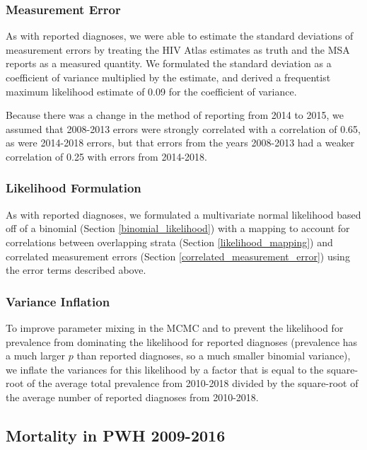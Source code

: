 \documentclass{article}
\begin{document}
\subsubsection{Measurement Error} \label{prevalence_measurement_error}

As with reported diagnoses, we were able to estimate the standard deviations of measurement errors by treating the HIV Atlas estimates as truth and the MSA reports as a measured quantity. We formulated the standard deviation as a coefficient of variance multiplied by the estimate, and derived a frequentist maximum likelihood estimate of 0.09 for the coefficient of variance.

Because there was a change in the method of reporting from 2014 to 2015, we assumed that 2008-2013 errors were strongly correlated with a correlation of 0.65, as were 2014-2018 errors, but that errors from the years 2008-2013 had a weaker correlation of 0.25 with errors from 2014-2018.

\subsubsection{Likelihood Formulation}

As with reported diagnoses, we formulated a multivariate normal likelihood based off of a binomial (Section \ref{binomial_likelihood}) with a mapping to account for correlations between overlapping strata (Section \ref{likelihood_mapping}) and correlated measurement errors (Section \ref{correlated_measurement_error}) using the error terms described above.

\subsubsection{Variance Inflation}
To improve parameter mixing in the MCMC and to prevent the likelihood for prevalence from dominating the likelihood for reported diagnoses (prevalence has a much larger $p$ than reported diagnoses, so a much smaller binomial variance), we inflate the variances for this likelihood by a factor that is equal to the square-root of the average total prevalence from 2010-2018 divided by the square-root of the average number of reported diagnoses from 2010-2018.

\subsection{Mortality in PWH 2009-2016}
\end{document}
